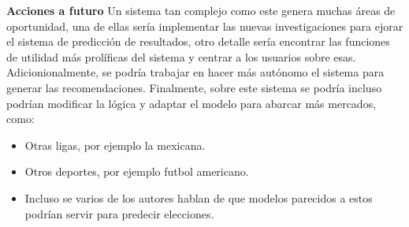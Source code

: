 %
%
%
%
%
%
%
%
%
%
%
%



\textbf{Acciones a futuro}
Un sistema tan complejo como este genera muchas áreas de oportunidad, una de ellas sería implementar las nuevas investigaciones para ejorar el sistema de predicción de resultados, otro detalle sería encontrar las funciones de utilidad más prolíficas del sistema y centrar a los usuarios sobre esas. Adicionionalmente, se podría trabajar en hacer más autónomo el sistema para generar las recomendaciones. Finalmente, sobre este sistema se podría incluso podrían modificar la lógica y adaptar el modelo para abarcar más mercados, como:
\begin{itemize}

	\item Otras ligas, por ejemplo la mexicana.

		\item Otros deportes, por ejemplo futbol americano.

	\item Incluso se varios de los autores hablan de que modelos parecidos a estos podrían servir para predecir elecciones.

\end{itemize}


